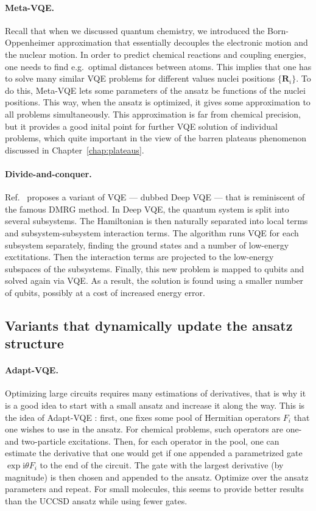 \paragraph{Meta-VQE.} Recall that when we discussed quantum chemistry, we introduced the Born-Oppenheimer approximation that essentially decouples the electronic motion and the nuclear motion. In order to predict chemical reactions and coupling energies, one needs to find e.g.~optimal distances between atoms. This implies that one has to solve many similar VQE problems for different values nuclei positions $\{\mathbf{R}_i\}$. To do this, Meta-VQE lets some parameters of the ansatz be functions of the nuclei positions. This way, when the ansatz is optimized, it gives some approximation to all problems simultaneously. This approximation is far from chemical precision, but it provides a good inital point for further VQE solution of individual problems, which quite important in the view of the barren plateaus phenomenon discussed in Chapter~\ref{chap:plateaus}.

\paragraph{Divide-and-conquer.} Ref.~\cite{fujii_deep_2020} proposes a variant of VQE --- dubbed Deep VQE --- that is reminiscent of the famous DMRG method. In Deep VQE, the quantum system is split into several subsystems. The Hamiltonian is then naturally separated into local terms and subsystem-subsystem interaction terms. The algorithm runs VQE for each subsystem separately, finding the ground states and a number of low-energy exctitations. Then the interaction terms are projected to the low-energy subspaces of the subsystems. Finally, this new problem is mapped to qubits and solved again via VQE. As a result, the solution is found using a smaller number of qubits, possibly at a cost of increased energy error.

\subsection{Variants that dynamically update the ansatz structure}

\paragraph{Adapt-VQE.} Optimizing large circuits requires many estimations of derivatives, that is why it is a good idea to start with a small ansatz and increase it along the way. This is the idea of Adapt-VQE \cite{grimsley_adaptive_2019}: first, one fixes some pool of Hermitian operators $F_i$ that one wishes to use in the ansatz. For chemical problems, such operators are one- and two-particle excitations. Then, for each operator in the pool, one can estimate the derivative that one would get if one appended a parametrized gate $\exp{\mathrm{i} \theta F_i}$ to the end of the circuit. The gate with the largest derivative (by magnitude) is then chosen and appended to the ansatz. Optimize over the ansatz parameters and repeat. For small molecules, this seems to provide better results than the UCCSD ansatz while using fewer gates. 

